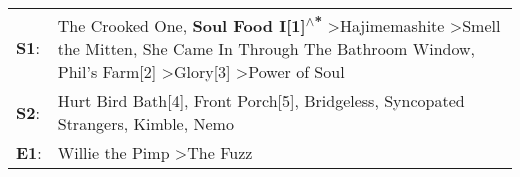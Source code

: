 \begin{supertabular}{p{0.03\textwidth}p{0.92\textwidth}}
 \textbf{S1}:  &  The Crooked One\textsuperscript{}, \enspace \textbf{Soul Food I[1]\textsuperscript{$\wedge$*}} \textgreater \enspace Hajimemashite\textsuperscript{} \textgreater \enspace Smell the Mitten\textsuperscript{}, \enspace She Came In Through The Bathroom Window\textsuperscript{}, \enspace Phil's Farm[2]\textsuperscript{} \textgreater \enspace Glory[3]\textsuperscript{} \textgreater \enspace Power of Soul\textsuperscript{}  \enspace  \\
 \textbf{S2}:  &                                                                                                                                                                                           Hurt Bird Bath[4]\textsuperscript{}, \enspace Front Porch[5]\textsuperscript{}, \enspace Bridgeless\textsuperscript{}, \enspace Syncopated Strangers\textsuperscript{}, \enspace Kimble\textsuperscript{}, \enspace Nemo\textsuperscript{}  \enspace  \\
 \textbf{E1}:  &                                                                                                                                                                                                                                                                                                                                                   Willie the Pimp\textsuperscript{} \textgreater \enspace The Fuzz\textsuperscript{}  \enspace  \\
\end{supertabular}
